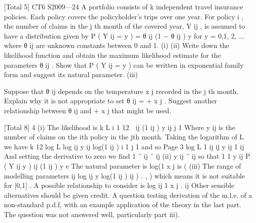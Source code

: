 \documentclass[a4paper,12pt]{article}
\begin{document}
[Total 5]
CT6 S2009—24
A portfolio consists of k independent travel insurance policies. Each policy covers the
policyholder’s trips over one year. For policy i , the number of claims in the j th month
of the covered year, Y ij , is assumed to have a distribution given by
P ( Y ij = y ) = θ ij (1 − θ ij ) y for y = 0,1, 2, ...
where θ ij are unknown constants between 0 and 1.
(i)
(ii)
Write down the likelihood function and obtain the maximum likelihood
estimate for the parameters θ ij .
Show that P ( Y ij = y ) can be written in exponential family form and suggest its
natural parameter.
(iii)


Suppose that θ ij depends on the temperature x j recorded in the j th month.
Explain why it is not appropriate to set θ ij = \alpha + \beta x j . Suggest another
relationship between θ ij and \alpha + \beta x j that might be used.

[Total 8]
4
(i) The likelihood is
k
L
i 1
12

ij (1
ij )
y ij
j 1
Where y ij is the number of claims on the ith policy in the jth month.
Taking the logarithm of L we have
k 12
log L
log
ij
y ij log(1
ij )
i 1 j 1
and so
Page 3%
log L 1
ij ij
y ij
1
ij
And setting the derivative to zero we find 1 ˆ ij
ˆ
ij
(ii)
y ij ˆ ij so that
1
1 y ij
P ( Y ij
y )
ij (1
ij )
y
e
The natural parameter is log(1
x j is (
(iii) The range of
modelling parameters
ij
log
ij
y log(1
ij )
ij ) .
,
) which means it is not suitable for
[0,1] .
A possible relationship to consider is log
ij
1
x j .
ij
Other sensible alternatives should be given credit.
A question testing derivation of the m.l.e. of a non-standard p.d.f, with an example
application of the theory in the last part. The question was not answered well,
particularly part iii).
\end{document}
